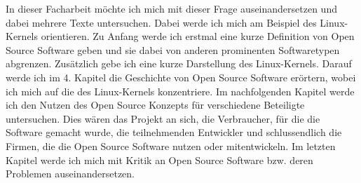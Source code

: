 \documentclass[a4paper,12pt]{article}
\begin{document}
In dieser Facharbeit möchte ich mich mit dieser Frage auseinandersetzen und dabei mehrere Texte untersuchen. Dabei werde ich mich am Beispiel des Linux-Kernels orientieren. Zu Anfang werde ich erstmal eine kurze Definition von Open Source Software geben und sie dabei von anderen prominenten Softwaretypen abgrenzen. Zusätzlich gebe ich eine kurze Darstellung des Linux-Kernels. Darauf werde ich im 4. Kapitel die Geschichte von Open Source Software erörtern, wobei ich mich auf die des Linux-Kernels konzentriere. Im nachfolgenden Kapitel werde ich den Nutzen des Open Source Konzepts für verschiedene Beteiligte untersuchen. Dies wären das Projekt an sich, die Verbraucher, für die die Software gemacht wurde, die teilnehmenden Entwickler und schlussendlich die Firmen, die die Open Source Software nutzen oder mitentwickeln. Im letzten Kapitel werde ich mich mit Kritik an Open Source Software bzw. deren Problemen auseinandersetzen.
\end{document}
